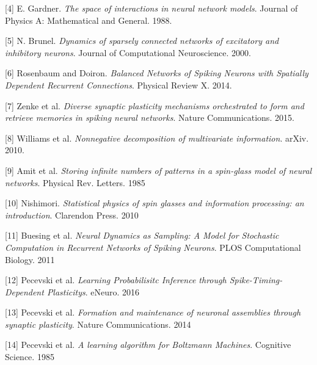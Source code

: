 \documentclass{ucetd}
\begin{document}
[4] E. Gardner. \textit{The space of interactions in neural network models}. Journal of Physics A: Mathematical and General. 1988.

[5] N. Brunel. \textit{Dynamics of sparsely connected networks of excitatory and inhibitory neurons}. Journal of Computational Neuroscience. 2000. 

[6] Rosenbaum and Doiron. \textit{Balanced Networks of Spiking Neurons with Spatially Dependent Recurrent Connections}. Physical Review X. 2014.

[7] Zenke et al. \textit{Diverse synaptic plasticity mechanisms
orchestrated to form and retrieve memories
in spiking neural networks}. Nature Communications. 2015.

[8] Williams et al. \textit{Nonnegative decomposition of multivariate information}. arXiv. 2010.

[9] Amit et al. \textit{Storing infinite numbers of patterns in a spin-glass model of neural networks}. Physical Rev. Letters. 1985

[10] Nishimori. \textit{Statistical physics of spin glasses and information processing: an introduction}. Clarendon Press. 2010

[11] Buesing et al. \textit{Neural Dynamics as Sampling: A Model for Stochastic Computation in Recurrent Networks of Spiking Neurons}. PLOS Computational Biology. 2011

[12] Pecevski et al. \textit{Learning Probabilisitc Inference through Spike-Timing-Dependent Plasticitys}. eNeuro. 2016

[13] Pecevski et al. \textit{Formation and maintenance of neuronal assemblies through synaptic plasticity}. Nature Communications. 2014

[14] Pecevski et al. \textit{A learning algorithm for Boltzmann Machines}. Cognitive Science. 1985

%
%
\end{document}
